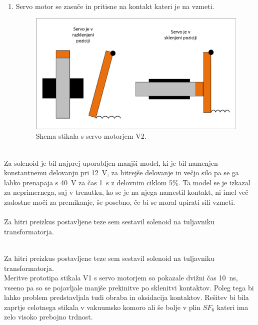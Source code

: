 \documentclass[a4paper,twoside,openright,12pt,Slovene]{book}
\begin{document}
\begin{enumerate}
    \item  Servo motor se zasuče in pritisne na kontakt kateri je na vzmeti.
    \begin{figure}[H]
        \centering
        \includegraphics[width=1\columnwidth]{Sheme/StikaloServoVerzija2.pdf}
        \caption{\label{StikaloServoVerzija2} Shema stikala s servo motorjem V2.}
    \end{figure}
\end{enumerate}


    ~\\Za solenoid je bil najprej uporabljen manjši model, ki je bil namenjen konstantnemu delovanju pri \SI{12}{\volt}, za hitrejše delovanje in večjo silo pa se ga lahko prenapaja s \SI{40}{\volt} za čas  \SI{1}{\second} z delovnim ciklom 5\%. Ta model se je izkazal za neprimernega, saj v trenutku, ko se je na njega namestil kontakt, ni imel več zadostne moči za premikanje, še posebno, če bi se moral upirati sili vzmeti. 
~\\ 
~\\Za hitri preizkus postavljene teze sem sestavil solenoid na tuljavniku transformatorja.
    
    ~\\Za hitri preizkus postavljene teze sem sestavil solenoid na tuljavniku
transformatorja. 
~\\Meritve prototipa stikala V1 s servo motorjem so pokazale dvižni čas \SI{10}{\nano\second}, vseeno pa so se pojavljale manjše prekinitve po sklenitvi kontaktov. Poleg tega bi lahko problem predstavljala tudi obraba in oksidacija kontaktov. Rešitev bi bila zaprtje celotnega stikala v vakuumsko komoro ali še bolje v plin $SF_{6}$ kateri ima zelo visoko prebojno trdnost.
    
\end{document}
